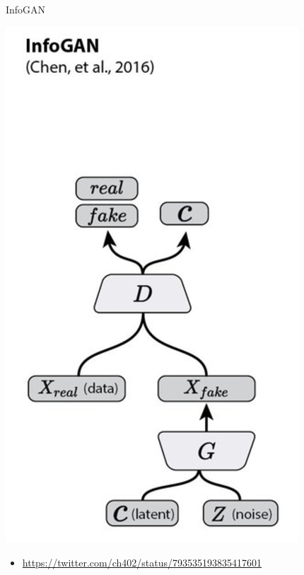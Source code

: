 \documentclass{beamer}
\begin{document}
\begin{frame}{InfoGAN}{}

\begin{center}
    \includegraphics[height=0.6\textheight]{infogan}
\end{center}

\begin{itemize}
  \item {
    \url{https://twitter.com/ch402/status/793535193835417601}
  }
  \end{itemize}

\end{frame}
\end{document}
